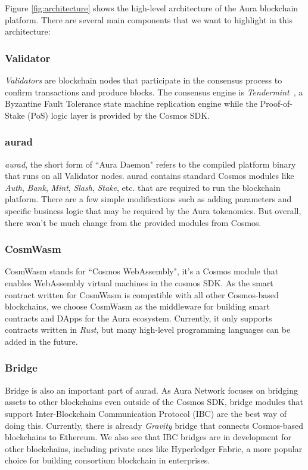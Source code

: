\documentclass[12pt, titlepage]{article}
\begin{document}
Figure \ref{fig:architecture} shows the high-level architecture of the Aura blockchain platform. There are several main components that we want to highlight in this architecture:

\subsubsection*{Validator}
\emph{Validators} are blockchain nodes that participate in the consensus process to confirm transactions and produce blocks.
The consensus engine is \emph{Tendermint}~\cite{buchman2016tendermint}, a Byzantine Fault Tolerance state machine replication engine while the Proof-of-Stake (PoS) logic layer is provided by the Cosmos SDK. 

\subsubsection*{aurad}
\emph{aurad}, the short form of ``Aura Daemon" refers to the compiled platform binary that runs on all Validator nodes. aurad contains standard Cosmos modules like \emph{Auth}, \emph{Bank}, \emph{Mint}, \emph{Slash}, \emph{Stake}, etc. that are required to run the blockchain platform. There are a few simple modifications such as adding parameters and specific business logic that may be required by the Aura tokenomics. But overall, there won't be much change from the provided modules from Cosmos.

\subsubsection*{CosmWasm}
CosmWasm stands for ``Cosmos WebAssembly", it's a Cosmos module that enables WebAssembly virtual machines in the cosmos SDK. As the smart contract written for CosmWasm is compatible with all other Cosmos-based blockchains, we choose CosmWasm as the middleware for building smart contracts and DApps for the Aura ecosystem. Currently, it only supports contracts written in \emph{Rust}, but many high-level programming languages can be added in the future.

\subsubsection*{Bridge}
Bridge is also an important part of aurad. As Aura Network focuses on bridging assets to other blockchains even outside of the Cosmos SDK, bridge modules that support  Inter-Blockchain Communication Protocol (IBC) are the best way of doing this. Currently, there is already \emph{Gravity} bridge that connects Cosmos-based blockchains to Ethereum. We also see that IBC bridges are in development for other blockchains, including private ones like Hyperledger Fabric, a more popular choice for building consortium blockchain in enterprises. 
\end{document}
